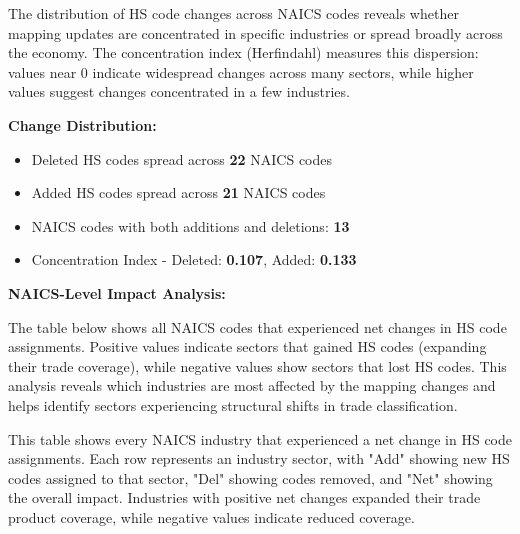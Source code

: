 \documentclass[11pt]{article}
\begin{document}
The distribution of HS code changes across NAICS codes reveals whether mapping updates are concentrated in specific industries or spread broadly across the economy. The concentration index (Herfindahl) measures this dispersion: values near 0 indicate widespread changes across many sectors, while higher values suggest changes concentrated in a few industries.

\textbf{Change Distribution:}
\begin{itemize}
    \item Deleted HS codes spread across \textbf{22} NAICS codes
    \item Added HS codes spread across \textbf{21} NAICS codes
    \item NAICS codes with both additions and deletions: \textbf{13}
    \item Concentration Index - Deleted: \textbf{0.107}, Added: \textbf{0.133}
\end{itemize}

\textbf{NAICS-Level Impact Analysis:}

The table below shows all NAICS codes that experienced net changes in HS code assignments. Positive values indicate sectors that gained HS codes (expanding their trade coverage), while negative values show sectors that lost HS codes. This analysis reveals which industries are most affected by the mapping changes and helps identify sectors experiencing structural shifts in trade classification.


This table shows every NAICS industry that experienced a net change in HS code assignments. Each row represents an industry sector, with "Add" showing new HS codes assigned to that sector, "Del" showing codes removed, and "Net" showing the overall impact. Industries with positive net changes expanded their trade product coverage, while negative values indicate reduced coverage.
\end{document}
